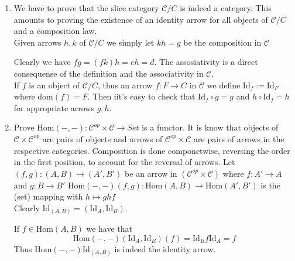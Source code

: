 \documentclass[11pt]{article}
\theoremstyle{plain}
\theoremstyle{definition}
\theoremstyle{remark}
\newcommand{\cC}{\mathcal{C}}
\newcommand{\Hom}{\mathrm{Hom}}
\newcommand{\dom}{\mathrm{dom}}
\begin{document}
\begin{exercises}
\begin{enumerate}
 \item We have to prove that the slice category $\cC/C$ is indeed a category. This amounts to proving the existence of an identity arrow for all objects of $\cC/C$ and a composition law. \\
  Given arrows $h,k$ of $\cC/C$ we simply let $kh=g$ be the composition in $\mathcal{C}$
Clearly we have $fg=(fk)h=eh=d$.
 The assosiativity is a direct consequense of the definition and the associativity in $\cC$.\\
 If $f$ is an object of $\cC/C$, thus an arrow $f:F \to C$ in $\cC$ we define $\text{Id}_f:=\text{Id}_F$ where $\dom(f)=F$. Then iit's easy to check that $\text{Id}_f \circ g =g$ and $h \circ \text{Id}_f=h$ for appropriate arrows $g,h$.

 \item Prove $\Hom(-,-):\cC^{op} \times \cC \to Set$ is a functor. It is know that objects of $\cC \times \cC^{op}$ are pairs of objects and arrows of $\cC^{op} \times \cC$ are pairs of arrows in the respective categories.
Composition is done componetwise, reversing the order in the first position, to account for the reversal of arrows. Let $(f,g):(A,B)\to(A',B')$ be an arrow in $(\cC^{op} \times \cC)$ where $f:A'\to A$ and $g:B \to B'$ 
$\Hom(-,-)(f,g):\Hom(A,B) \to \Hom(A',B')$ is the (set) mapping with $h \mapsto g h f$\\
Clearly $\text{Id}_{(A,B)}=(\text{Id}_A,\text{Id}_B)$. 


If $f \in \Hom(A,B)$ we have that \[\Hom(-,-)(\text{Id}_A,\text{Id}_B)(f)=\text{Id}_B f \text{Id}_A=f\] Thus $\Hom(-,-)\text{Id}_{(A,B)}$ is indeed the identity arrow.\\
 

\end{enumerate}
\end{exercises}
\end{document}
